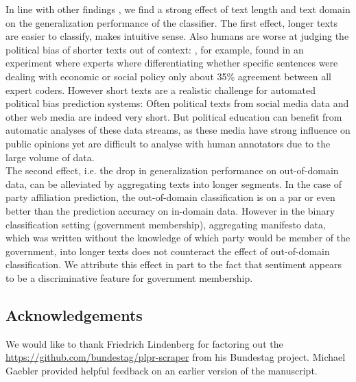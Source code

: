\documentclass[11pt]{article}
\begin{document}
In line with other findings \cite{Yu2008, Hirst2014}, we find a strong effect of text length and text domain on the generalization performance of the classifier. The first effect, longer texts are easier to classify, makes intuitive sense. Also humans are worse at judging the political bias of shorter texts out of context: \cite{Benoit.Forthcoming}, for example, found in an experiment where experts where differentiating whether specific sentences were dealing with economic or social policy only about 35\% agreement between all expert coders. However short texts are a realistic challenge for automated political bias prediction systems: Often political texts from social media data and other web media are indeed very short. But political education can benefit from automatic analyses of these data streams, as these media have strong influence on public opinions yet are difficult to analyse with human annotators due to the large volume of data. \\
The second effect, i.e. the drop in generalization performance on out-of-domain data, can be alleviated by aggregating texts into longer segments. In the case of party affiliation prediction, the out-of-domain classification is on a par or even better than the prediction accuracy on in-domain data. However in the binary classification setting (government membership), aggregating manifesto data, which was written without the knowledge of which party would be member of the government, into longer texts does not counteract the effect of out-of-domain classification. We attribute this effect in part to the fact that sentiment appears to be a discriminative feature for government membership. 

\subsection*{Acknowledgements}
We would like to thank Friedrich Lindenberg for factoring out the \url{https://github.com/bundestag/plpr-scraper} from his Bundestag project. Michael Gaebler provided helpful feedback on an earlier version of the manuscript. \\
%


\end{document}
